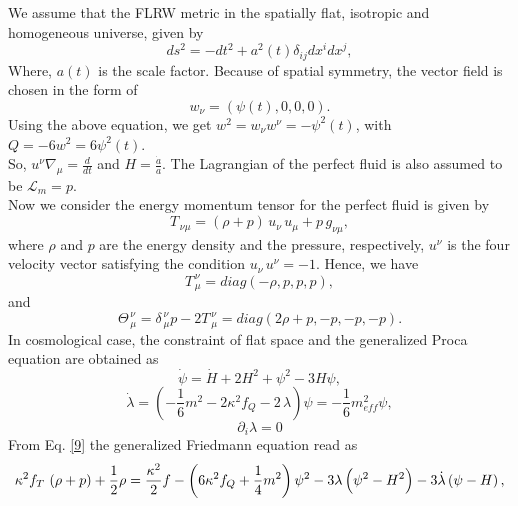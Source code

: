 We assume that the FLRW metric in the spatially flat, isotropic and homogeneous universe, given by
\begin{equation}
\label{15}
ds^2=-dt^2+a^2(t) \delta_{ij}  dx^i  dx^j ,
\end{equation}
Where, $a(t)$ is the scale factor. Because of spatial symmetry, the vector field is chosen in the form of
\begin{equation}
\label{16}
w_\nu=\left(\psi (t), 0, 0, 0\right) .
\end{equation}
Using the above equation, we get $w^2=w_\nu w^\nu=-\psi^2(t)$, with $Q=-6w^2=6\psi^2(t)$.\\
So, $u^\nu \nabla_\mu=\frac{d}{dt}$ and $H=\frac{\dot{a}}{a}$. The Lagrangian of the perfect fluid is also assumed to be $\mathcal{L}_m=p$.\\
Now we consider the energy momentum tensor for the perfect fluid is given by 
\begin{equation}
\label{17}
T_{\,\nu\mu}=\left(\rho+p\right)\,u_\nu \,u_\mu+p\,g_{\nu\mu},
\end{equation}
where $\rho$ and $p$ are the energy density and the pressure, respectively, $u^\nu$ is the four velocity vector satisfying the condition $u_\nu \,u^\nu=-1$. Hence, we have
\begin{equation}
\label{18}
 T^{\,\nu}_{\,\mu}=diag\left(-\rho, p, p, p\right),
\end{equation}
and
\begin{equation}
\label{19}
\Theta^{\,\nu}_{\,\mu}=\delta^{\,\nu}_{\,\mu} p-2T^{\,\nu}_{\,\mu}=diag\left(2 \rho+p, -p,  -p, -p\right).
\end{equation}
In cosmological case, the constraint of flat space and the generalized Proca equation are obtained as
\begin{equation}
\label{20}
\dot{\psi}=\dot{H}+2 H^2+\psi^2-3 H \psi,
\end{equation}
\begin{equation}
\label{21}
\dot{\lambda}=\left(-\frac{1}{6}m^2-2\kappa^2 f_Q-2\,\lambda\right) \psi=-\frac{1}{6} m^2_{ eff} \psi ,
\end{equation}
\begin{equation}
\label{22}
\partial_i \lambda=0
\end{equation}
From Eq. \eqref{9} the generalized Friedmann equation read as
\begin{equation}
\label{23}
\kappa^2f_T\,\left(\rho+p\right)+\frac{1}{2}\rho=\frac{\kappa^2}{2}f-\left(6\kappa^2f_Q+\frac{1}{4}m^2\right)\psi^2 \\
-3\lambda\left(\psi^2-H^2\right)-3\dot{\lambda}\left(\psi-H\right),
\end{equation}

